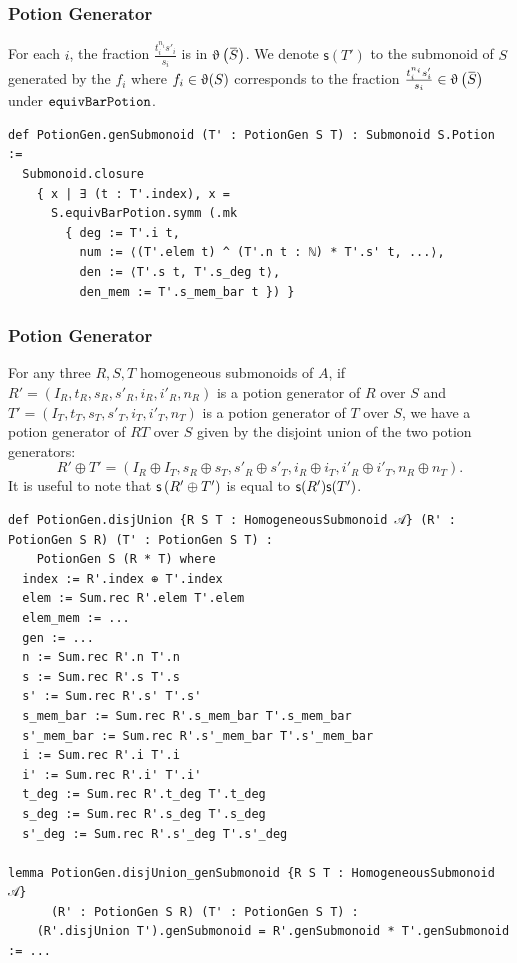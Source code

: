 \documentclass[9pt]{beamer}
\begin{document}
\begin{frame}[fragile]
  \frametitle{Potion Generator}
  For each $i$, the fraction $\frac{t_i^{n_i}s'_i}{s_i}$ is in $\potion\left( \mybar{S} \right)$.
We denote $\mathsf{s}(T')$ to the submonoid of $S$ generated by the $f_i$ where $f_i\in\operatorname{\upvartheta}(S)$ 
corresponds to the fraction $\frac{t_i^{n_i}s'_i}{s_i} \in \potion\left( \mybar{S} \right)$ under ${\footnotesize{\mathtt{equivBarPotion}}}$.
\begin{lstlisting}[extendedchars=true]
def PotionGen.genSubmonoid (T' : PotionGen S T) : Submonoid S.Potion :=
  Submonoid.closure
    { x | ∃ (t : T'.index), x =
      S.equivBarPotion.symm (.mk
        { deg := T'.i t,
          num := ⟨(T'.elem t) ^ (T'.n t : ℕ) * T'.s' t, ...⟩,
          den := ⟨T'.s t, T'.s_deg t⟩,
          den_mem := T'.s_mem_bar t }) }
\end{lstlisting}
\end{frame}

\begin{frame}[fragile]
  \frametitle{Potion Generator}
  For any three $R, S, T$ homogeneous submonoids of $A$, 
  if $R' = \left( I_R, t_R, s_R, {s'}_R, i_R, {i'}_R, n_R \right)$ is a potion generator of $R$ over $S$ and 
  $T' = \left( I_T, t_T, s_T, {s'}_T, i_T, {i'}_T, n_T \right)$ is a potion generator of $T$ over $S$, 
  we have a potion generator of $RT$ over $S$ given by the disjoint union of the two potion generators:
  \[R' \oplus T' = (I_R \oplus I_T, s_R \oplus s_T, {s'}_R \oplus {s'}_T, i_R \oplus i_T, {i'}_R \oplus {i'}_T, n_R \oplus n_T).\]
It is useful to note that $\mathsf{s}\left( R'\oplus T' \right)$ is equal to $\mathsf{s}(R')\mathsf{s}(T')$.
\begin{lstlisting}[caption={Disjoint union of potion generators}, basicstyle=\ttfamily\footnotesize]
def PotionGen.disjUnion {R S T : HomogeneousSubmonoid 𝒜} (R' : PotionGen S R) (T' : PotionGen S T) :
    PotionGen S (R * T) where
  index := R'.index ⊕ T'.index
  elem := Sum.rec R'.elem T'.elem
  elem_mem := ...
  gen := ...
  n := Sum.rec R'.n T'.n
  s := Sum.rec R'.s T'.s
  s' := Sum.rec R'.s' T'.s'
  s_mem_bar := Sum.rec R'.s_mem_bar T'.s_mem_bar
  s'_mem_bar := Sum.rec R'.s'_mem_bar T'.s'_mem_bar
  i := Sum.rec R'.i T'.i
  i' := Sum.rec R'.i' T'.i'
  t_deg := Sum.rec R'.t_deg T'.t_deg
  s_deg := Sum.rec R'.s_deg T'.s_deg
  s'_deg := Sum.rec R'.s'_deg T'.s'_deg

lemma PotionGen.disjUnion_genSubmonoid {R S T : HomogeneousSubmonoid 𝒜}
      (R' : PotionGen S R) (T' : PotionGen S T) :
    (R'.disjUnion T').genSubmonoid = R'.genSubmonoid * T'.genSubmonoid := ...
\end{lstlisting}
\end{frame}
\end{document}
